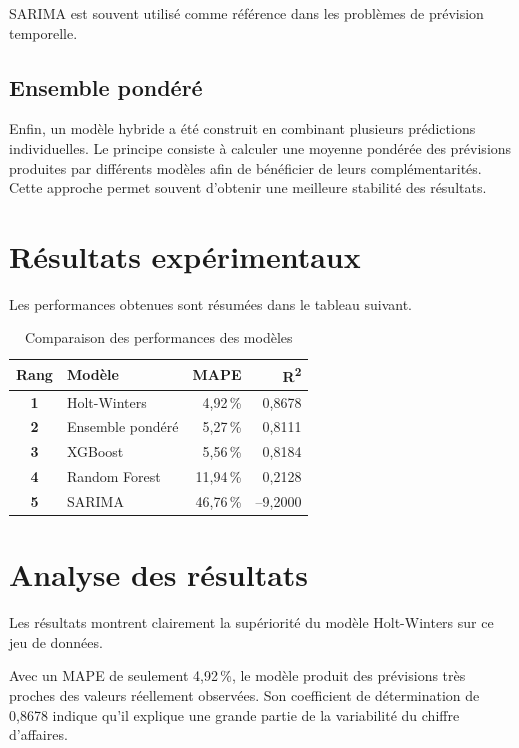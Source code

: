 \documentclass[12pt,a4paper,twoside]{report}
\begin{document}
SARIMA est souvent utilisé comme référence dans les problèmes de prévision temporelle.

\subsection{Ensemble pondéré}

Enfin, un modèle hybride a été construit en combinant plusieurs prédictions individuelles. Le principe consiste à calculer une moyenne pondérée des prévisions produites par différents modèles afin de bénéficier de leurs complémentarités. Cette approche permet souvent d'obtenir une meilleure stabilité des résultats.

\section{Résultats expérimentaux}

Les performances obtenues sont résumées dans le tableau suivant.

\begin{table}[H]
\centering
{}
\begin{tabular}{>{\bfseries}c l r r}
\toprule
\rowcolor{TableHeader}
\color{white}Rang & \color{white}Modèle & \color{white}MAPE & \color{white}R\textsuperscript{2} \\
\midrule
1 & Holt-Winters & 4,92\,\% & 0,8678 \\
2 & Ensemble pondéré & 5,27\,\% & 0,8111 \\
3 & XGBoost & 5,56\,\% & 0,8184 \\
4 & Random Forest & 11,94\,\% & 0,2128 \\
5 & SARIMA & 46,76\,\% & --9,2000 \\
\bottomrule
\end{tabular}
\caption{Comparaison des performances des modèles}
\label{tab:forecast-results}
\end{table}

\section{Analyse des résultats}

Les résultats montrent clairement la supériorité du modèle Holt-Winters sur ce jeu de données.

Avec un MAPE de seulement 4,92\,\%, le modèle produit des prévisions très proches des valeurs réellement observées. Son coefficient de détermination de 0,8678 indique qu'il explique une grande partie de la variabilité du chiffre d'affaires.
\end{document}
